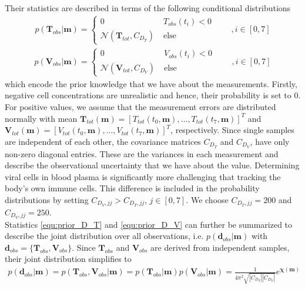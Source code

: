 Their statistics are described in terms of the following conditional distributions
\begin{align}
    p(\mathbf{T}_{obs}|\mathbf{m}) = 
    \begin{cases}
        0 \quad & T_{obs}(t_i) < 0\\
        \mathcal{N}(\mathbf{T}_{tot}, C_{D_T}) \; & \text{else}
    \end{cases} \quad\quad ,i \in [0,7]
    \label{equ:prior_D_T}
\end{align}
\begin{align}
    p(\mathbf{V}_{obs}|\mathbf{m}) = 
    \begin{cases}
        0 \quad & V_{obs}(t_i) < 0\\
        \mathcal{N}(\mathbf{V}_{tot}, C_{D_V}) \; & \text{else}
    \end{cases} \quad\quad ,i \in [0,7]
    \label{equ:prior_D_V}
\end{align}
which encode the prior knowledge that we have about the measurements.
Firstly, negative cell concentrations are unrealistic and hence, their probability is set to 0.
For positive values, we assume that the measurement errors are distributed normally with mean $\mathbf{T}_{tot}(\mathbf{m}) = [T_{tot}(t_0,\mathbf{m}),\dots,T_{tot}(t_7,\mathbf{m})]^T$ and $\mathbf{V}_{tot}(\mathbf{m}) = [V_{tot}(t_0,\mathbf{m}),\dots,V_{tot}(t_7,\mathbf{m})]^T$, respectively.
Since single samples are independent of each other, the covariance matrices $C_{D_T}$ and $C_{D_V}$, have only non-zero diagonal entries.
These are the variances in each measurement and describe the observational uncertainty that we have about the value.
Determining viral cells in blood plasma is significantly more challenging that tracking the body's own immune cells.
This difference is included in the probability distributions by setting $C_{{D_V},jj} > C_{{D_T},jj}$, $j \in [0,7]$. 
We choose $C_{{D_T},jj} = 200$ and $C_{{D_V},jj} = 250$.\\
Statistics \ref{equ:prior_D_T} and \ref{equ:prior_D_V} can further be summarized to describe the joint distribution over all observations, i.e. $p(\mathbf{d}_{obs}|\mathbf{m})$ with $\mathbf{d}_{obs} = \{\mathbf{T}_{obs},\mathbf{V}_{obs}\}$.
Since $\mathbf{T}_{obs}$ and $\mathbf{V}_{obs}$ are derived from independent samples, their joint distribution simplifies to
\begin{align}
        p(\mathbf{d}_{obs}|\mathbf{m})
        = p(\mathbf{T}_{obs},\mathbf{V}_{obs}|\mathbf{m}) 
        = p(\mathbf{T}_{obs}|\mathbf{m})p(\mathbf{V}_{obs}|\mathbf{m}) 
        = \frac{1}{4\pi^2 \sqrt{|C_{D_T}||C_{D_V}|}}e^{\mathbf{\chi}(\mathbf{m})}
    \label{equ:prior_D}
\end{align}

